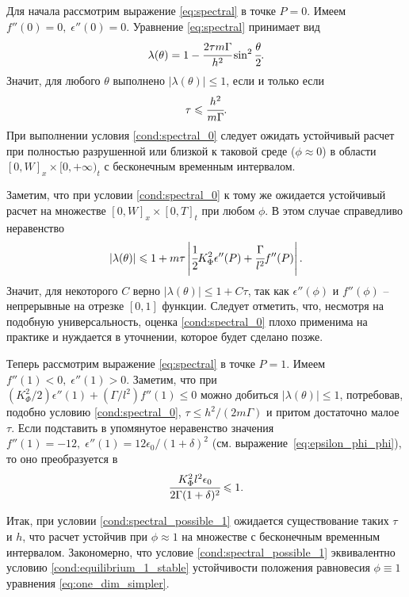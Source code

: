 Для начала рассмотрим выражение \eqref{eq:spectral} в точке $P = 0$. Имеем $f''(0) = 0, \; \epsilon''(0) = 0$. Уравнение \eqref{eq:spectral} принимает вид
$$\lambda(\theta) = 1 - \cfrac{2 \tau m \Gamma}{h^2} \sin^2 \cfrac{\theta}{2} {\text{.}}$$
Значит, для любого $\theta$ выполнено $|\lambda(\theta)| \leqslant 1$, если и только если
\begin{equation}
     \tau \leqslant \cfrac{h^2}{m \Gamma} {\text{.}}
     \label{cond:spectral_0}
\end{equation}
При выполнении условия \eqref{cond:spectral_0} следует ожидать устойчивый расчет при полностью разрушенной или близкой к таковой среде ($\phi \approx 0$) в области $[0, W]_x \times [0, +\infty)_t$ с бесконечным временным интервалом.

Заметим, что при условии \eqref{cond:spectral_0} к тому же ожидается устойчивый расчет на множестве $[0, W]_x \times [0, T]_t$ при любом $\phi$. В этом случае справедливо неравенство
$$|\lambda(\theta)| \leqslant 1 + m \tau \left| \cfrac{1}{2} K_\Phi^2 \epsilon''(P) + \cfrac{\Gamma}{l^2} f''(P) \right| {\text{.}}$$
Значит, для некоторого $C$ верно $|\lambda(\theta)| \leqslant 1 + C \tau$, так как $\epsilon''(\phi)$ и $f''(\phi)$ -- непрерывные на отрезке $[0, 1]$ функции. Следует отметить, что, несмотря на подобную универсальность, оценка \eqref{cond:spectral_0} плохо применима на практике и нуждается в уточнении, которое будет сделано позже.

Теперь рассмотрим выражение \eqref{eq:spectral} в точке $P = 1$. Имеем $f''(1) < 0, \; \epsilon''(1) > 0$. Заметим, что при $(K_\Phi^2 / 2) \epsilon''(1) + (\Gamma / l^2) f''(1) \leqslant 0$ можно добиться $|\lambda(\theta)| \leqslant 1$, потребовав, подобно условию \eqref{cond:spectral_0}, $\tau \leqslant h^2 / (2m \Gamma)$ и притом достаточно малое $\tau$. Если подставить в упомянутое неравенство значения $f''(1) = -12, \; \epsilon''(1) = 12 \epsilon_0 / (1 + \delta)^2$ (см. выражение~\eqref{eq:epsilon_phi_phi}), то оно преобразуется в
\begin{equation}
    \cfrac{K_\Phi^2 l^2 \epsilon_0}{2 \Gamma (1 + \delta)^2} \leqslant 1 {\text{.}}
    \label{cond:spectral_possible_1}
\end{equation}

Итак, при условии \eqref{cond:spectral_possible_1} ожидается существование таких $\tau$ и $h$, что расчет устойчив при $\phi \approx 1$ на множестве с бесконечным временным интервалом. Закономерно, что условие \eqref{cond:spectral_possible_1} эквивалентно условию \eqref{cond:equilibrium_1_stable} устойчивости положения равновесия $\phi \equiv 1$ уравнения \eqref{eq:one_dim_simpler}.